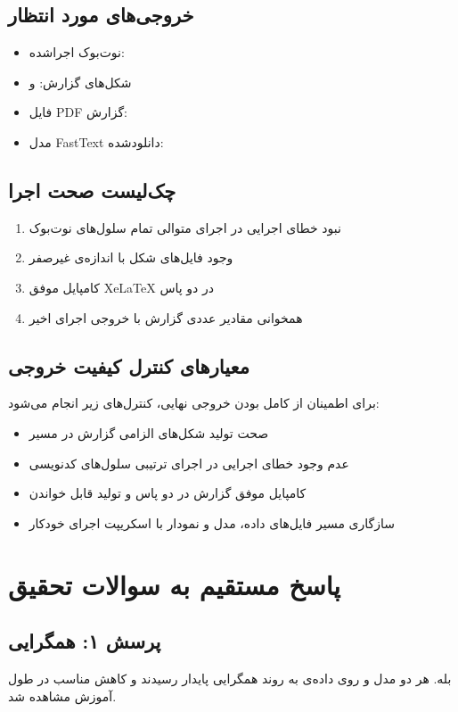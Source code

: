 \documentclass[12pt,a4paper]{article}
\begin{document}
\subsection{خروجی‌های مورد انتظار}
\begin{itemize}
\item نوت‌بوک اجراشده: 
\item شکل‌های گزارش:  و 
\item فایل PDF گزارش: 
\item مدل FastText دانلودشده: 
\end{itemize}

\subsection{چک‌لیست صحت اجرا}
\begin{enumerate}
\item نبود خطای اجرایی در اجرای متوالی تمام سلول‌های نوت‌بوک
\item وجود فایل‌های شکل با اندازه‌ی غیرصفر
\item کامپایل موفق XeLaTeX در دو پاس
\item همخوانی مقادیر عددی گزارش با خروجی اجرای اخیر
\end{enumerate}

\subsection{معیارهای کنترل کیفیت خروجی}
برای اطمینان از کامل بودن خروجی نهایی، کنترل‌های زیر انجام می‌شود:
\begin{itemize}
\item صحت تولید شکل‌های الزامی گزارش در مسیر 
\item عدم وجود خطای اجرایی در اجرای ترتیبی سلول‌های کدنویسی
\item کامپایل موفق گزارش در دو پاس و تولید  قابل خواندن
\item سازگاری مسیر فایل‌های داده، مدل و نمودار با اسکریپت اجرای خودکار
\end{itemize}

\section{پاسخ مستقیم به سوالات تحقیق}
\subsection{پرسش ۱: همگرایی }
بله. هر دو مدل  و  روی داده‌ی  به روند همگرایی پایدار رسیدند و کاهش مناسب  در طول آموزش مشاهده شد.
\end{document}
